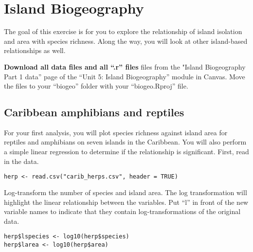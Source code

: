 \documentclass[11pt]{article}
\begin{document}
\thispagestyle{first_page}


\section*{Island Biogeography}
The goal of this exercise is for you to explore the relationship of
island isolation and area with species richness. Along the way, you will
look at other island-based relationships as well.

\textbf{Download all data files and all ``.r'' files} files from the "Island Biogeography Part 1 data” page of the “Unit 5: Island Biogeography” module in Canvas. Move the files to your “biogeo” folder with your “biogeo.Rproj” file.

\subsection*{Caribbean amphibians and reptiles}

For your first analysis, you will plot species richness against island area for reptiles and amphibians on seven islands in the Caribbean. You will also perform a simple linear regression to determine if the relationship is significant. First, read in the data.

{\small 
\begin{verbatim}
herp <- read.csv("carib_herps.csv", header = TRUE)
\end{verbatim}}

Log-transform the number of species and island area. The log transformation will highlight the linear relationship between the variables. Put ``l'' in front of the new variable names to indicate that they contain log-transformations of the original data.

\begin{verbatim}
herp$lspecies <- log10(herp$species)
herp$larea <- log10(herp$area)
\end{verbatim}

\end{document}
